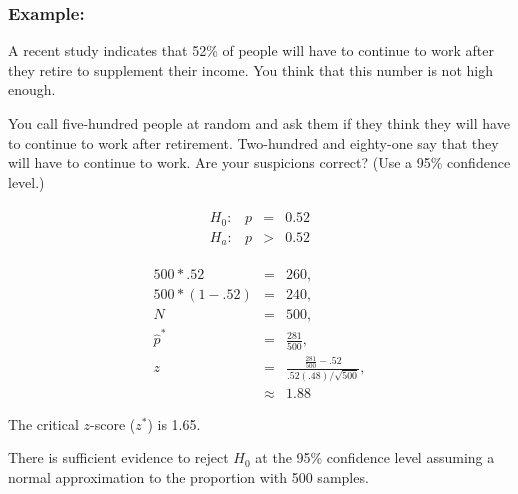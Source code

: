 \begin{frame}
  \frametitle{Example: }

  \vspace*{-2em}
  A recent study indicates that 52\% of people will have to continue
  to work after they retire to supplement their income. You think that
  this number is not high enough. 

  You call five-hundred people at random and ask them if they think
  they will have to continue to work after retirement. Two-hundred and
  eighty-one say that they will have to continue to work. Are your
  suspicions correct?  (Use a 95\% confidence level.)

  \vfill

  {
    \begin{eqnarray*}
      \begin{array}{lrcl}
        H_0: & p & = & 0.52 \\
        H_a: & p & > & 0.52
      \end{array}
    \end{eqnarray*}
  }

  {
    \begin{eqnarray*}
      500*.52     & = & 260, \\
      500*(1-.52) & = & 240, \\
      N & = & 500, \\
      \hat{p}^* & = & \frac{281}{500}, \\
      z & = & \frac{\frac{281}{500}-.52}{.52(.48)/\sqrt{500}}, \\
      & \approx & 1.88
    \end{eqnarray*}
  }
  

  {
    The critical $z$-score ($z^*$) is 1.65.
  }

  {

    {\color{red}
      There is sufficient evidence to reject $H_0$ at the 95\%
      confidence level assuming a normal approximation to the
      proportion with 500 samples.
    }

  }

  \vfill
  
\end{frame}


